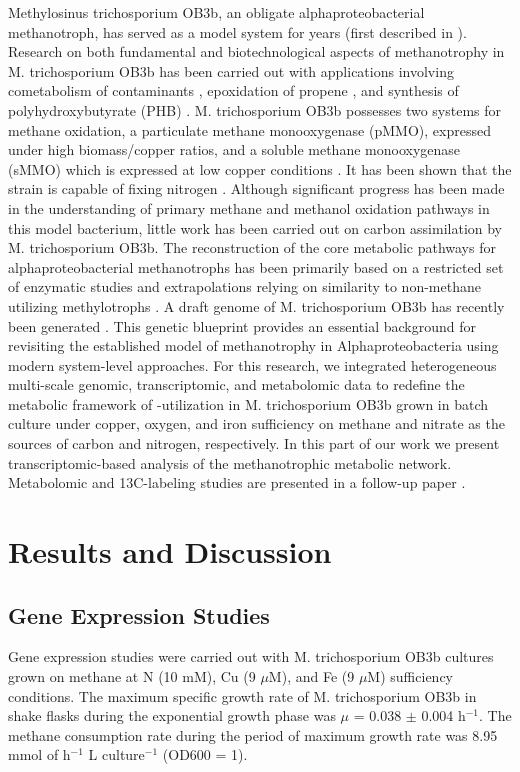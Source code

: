 Methylosinus trichosporium OB3b, an obligate alphaproteobacterial methanotroph, has served as a model system for years (first described in \cite{whittenbury1970}).
Research on both fundamental and biotechnological aspects of methanotrophy in M. trichosporium OB3b has been carried out with applications involving cometabolism of contaminants \cite{oldenhuis1991, EPA1993, fitch1996}, epoxidation of propene \cite{hou1979}, and synthesis of polyhydroxybutyrate (PHB) \cite{williams1998, doronina2008}.
M. trichosporium OB3b possesses two systems for methane oxidation, a particulate methane monooxygenase (pMMO), expressed under high biomass/copper ratios, and a soluble methane monooxygenase (sMMO) which is expressed at low copper conditions \cite{hakemian2007, semrau2010}.
It has been shown that the strain is capable of fixing nitrogen \cite{oakley1988, auman2001}.
Although significant progress has been made in the understanding of primary methane and methanol oxidation pathways in this model bacterium, little work has been carried out on carbon assimilation by M. trichosporium OB3b.
The reconstruction of the core metabolic pathways for alphaproteobacterial methanotrophs has been primarily based on a restricted set of enzymatic studies and extrapolations relying on similarity to non-methane utilizing methylotrophs \cite{lawrence1970, strom1974}.
A draft genome of M. trichosporium OB3b has recently been generated \cite{stein2010}.
This genetic blueprint provides an essential background for revisiting the established model of methanotrophy in Alphaproteobacteria using modern system-level approaches.
For this research, we integrated heterogeneous multi-scale genomic, transcriptomic, and metabolomic data to redefine the metabolic framework of -utilization in M. trichosporium OB3b grown in batch culture under copper, oxygen, and iron sufficiency on methane and nitrate as the sources of carbon and nitrogen, respectively.
In this part of our work we present transcriptomic-based analysis of the methanotrophic metabolic network.
Metabolomic and 13C-labeling studies are presented in a follow-up paper \cite{yangOB3b}.

\section{Results and Discussion}

\subsection{Gene Expression Studies}
Gene expression studies were carried out with M. trichosporium OB3b cultures grown on methane at N (10 mM), Cu (9 $\mu$M), and Fe (9 $\mu$M) sufficiency conditions.
The maximum specific growth rate of M. trichosporium OB3b in shake flasks during the exponential growth phase was $\mu$ = 0.038 $\pm$ 0.004 h$^{-1}$.
The methane consumption rate during the period of maximum growth rate was 8.95 mmol of  h$^{-1}$ L culture$^{-1}$ (OD600 = 1).

